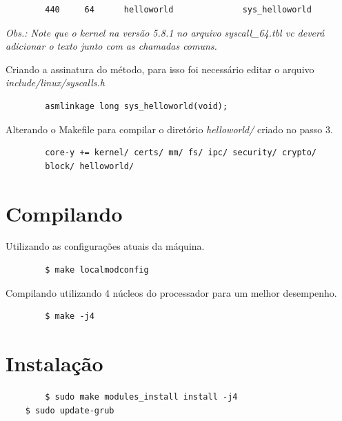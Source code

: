 \documentclass[12pt, a4paper]{article}
\begin{document}
	\begin{verbatim}
	    440     64      helloworld              sys_helloworld
	\end{verbatim}
	
	\par \textit{Obs.: Note que o kernel na versão 5.8.1 no arquivo syscall\_64.tbl vc deverá adicionar o texto junto com as chamadas comuns.}\\
	
	\par Criando a assinatura do método, para isso foi necessário editar o arquivo \textit{include/linux/syscalls.h}
	
	\begin{verbatim}
	    asmlinkage long sys_helloworld(void);
	\end{verbatim}
	
	\par Alterando o Makefile para compilar o diretório \textit{helloworld/} criado no passo 3.
	
	\begin{verbatim}
	    core-y += kernel/ certs/ mm/ fs/ ipc/ security/ crypto/
	    block/ helloworld/
	\end{verbatim}
	
	\section{Compilando}
	
	\par Utilizando as configurações atuais da máquina.
	
	\begin{verbatim}
	    $ make localmodconfig
	\end{verbatim}
	
	\par Compilando utilizando 4 núcleos do processador para um melhor desempenho.
	
	\begin{verbatim}
	    $ make -j4
	\end{verbatim}
	
	\section{Instalação}
	
	\begin{verbatim}
	    $ sudo make modules_install install -j4
    $ sudo update-grub
	\end{verbatim}
	
\end{document}
